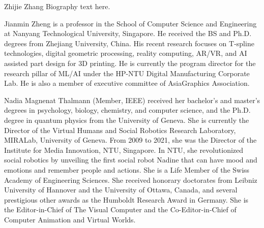 \documentclass[10pt,journal,compsoc]{IEEEtran}
\begin{document}
\begin{IEEEbiography}{Zhijie Zhang}
  Biography text here.
\end{IEEEbiography}

\begin{IEEEbiography}{Jianmin Zheng}
  is a professor in the School of Computer Science and Engineering at Nanyang Technological University, Singapore. He received the BS and Ph.D. degrees from Zhejiang University, China. His recent research focuses on T-spline technologies, digital geometric processing, reality computing, AR/VR, and AI assisted part design for 3D printing. He is currently the program director for the research pillar of ML/AI under the HP-NTU Digital Manufacturing Corporate Lab. He is also a member of executive committee of AsiaGraphics Association.
\end{IEEEbiography}

\begin{IEEEbiography}{Nadia Magnenat Thalmann}
  (Member, IEEE) received her bachelor's and master's degrees in psychology, biology, chemistry, and computer science, and the Ph.D. degree in quantum physics from the University of Geneva. She is currently the Director of the Virtual Humans and Social Robotics Research Laboratory, MIRALab, University of Geneva. From 2009 to 2021, she was the Director of the Institute for Media Innovation, NTU, Singapore. In NTU, she revolutionized social robotics by unveiling the first social robot Nadine that can have mood and emotions and remember people and actions. She is a Life Member of the Swiss Academy of Engineering Sciences. She received honorary doctorates from Leibniz University of Hannover and the University of Ottawa, Canada, and several prestigious other awards as the Humboldt Research Award in Germany. She is the Editor-in-Chief of The Visual Computer and the Co-Editor-in-Chief of Computer Animation and Virtual Worlds.
\end{IEEEbiography}



\end{document}
